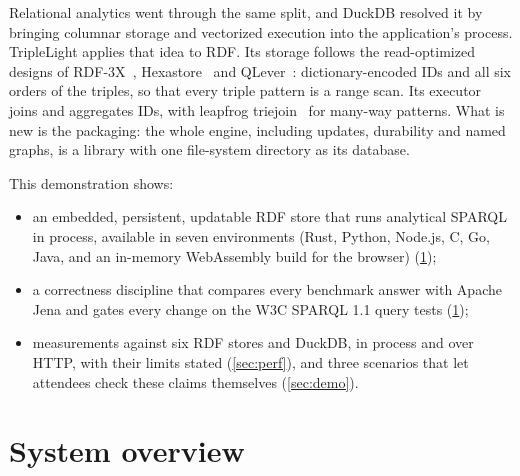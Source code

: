 \documentclass[sigconf,nonacm]{acmart}
\newcommand{\sys}{TripleLight}
\begin{document}
Relational analytics went through the same split, and DuckDB resolved it by bringing columnar storage and vectorized
execution into the application's process. \sys{} applies that idea to RDF. Its storage follows the read-optimized
designs of RDF-3X~\cite{rdf3x}, Hexastore~\cite{hexastore} and QLever~\cite{qlever}: dictionary-encoded IDs and all
six orders of the triples, so that every triple pattern is a range scan. Its executor joins and aggregates IDs, with
leapfrog triejoin~\cite{leapfrog} for many-way patterns. What is new is the packaging: the whole engine, including
updates, durability and named graphs, is a library with one file-system directory as its database.

This demonstration shows:
\begin{itemize}
  \item an embedded, persistent, updatable RDF store that runs analytical SPARQL in process, available in seven
        environments (Rust, Python, Node.js, C, Go, Java, and an in-memory WebAssembly build for the browser) (\cref{sec:system});
  \item a correctness discipline that compares every benchmark answer with Apache Jena and gates every change on the
        W3C SPARQL 1.1 query tests (\cref{sec:system});
  \item measurements against six RDF stores and DuckDB, in process and over HTTP, with their limits stated
        (\cref{sec:perf}), and three scenarios that let attendees check these claims themselves (\cref{sec:demo}).
\end{itemize}

\section{System overview}
\label{sec:system}
\end{document}
